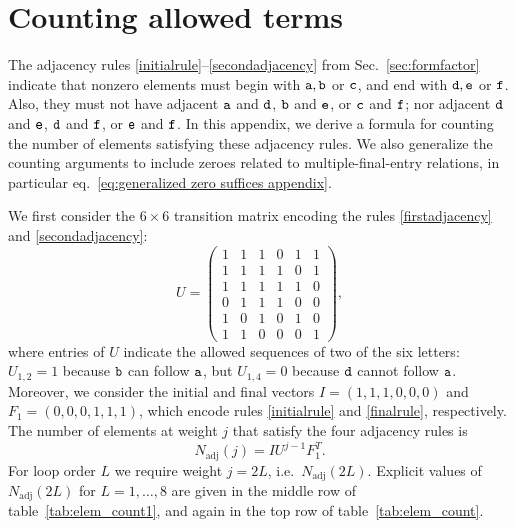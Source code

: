 \documentclass[12pt]{article}
\begin{document}
\section{Counting allowed terms} \label{app:combinatorics}

The adjacency rules \ref{initialrule}--\ref{secondadjacency} from 
Sec.~\ref{sec:formfactor} indicate that nonzero elements must begin with ${\tt a},{\tt b}$ or ${\tt c}$, and end with ${\tt d,e}$ or ${\tt f}$. Also, they must not have adjacent ${\tt a}$ and ${\tt d}$, ${\tt b}$ and ${\tt e}$, or ${\tt c}$ and ${\tt f}$; nor adjacent ${\tt d}$ and ${\tt e}$, ${\tt d}$ and ${\tt f}$, or ${\tt e}$ and ${\tt f}$. In this appendix, we derive a formula for counting the number of elements satisfying these adjacency rules.  We also generalize the counting arguments to include zeroes related to multiple-final-entry relations, in particular eq.~\eqref{eq:generalized zero suffices appendix}.

We first consider the $6 \times 6$ transition matrix encoding the rules \ref{firstadjacency} and \ref{secondadjacency}:
%
\begin{equation}
    U=\begin{pmatrix}1&1&1&0&1&1\\ 1&1&1&1&0&1\\ 1&1&1&1 &1&0\\ 0&1&1&1&0&0\\1&0&1&0&1&0\\ 1&1&0&0&0&1\end{pmatrix},
\end{equation}
%
where entries of $U$ indicate the allowed sequences of two of the six letters: $U_{1,2}=1$ because ${\tt b}$ can follow ${\tt a}$, but $U_{1,4}=0$ because ${\tt d}$ cannot follow ${\tt a}$. Moreover, we consider the initial and final vectors $I=(1,1,1,0,0,0)$ and $F_1=(0,0,0,1,1,1)$, which encode rules \ref{initialrule} and \ref{finalrule}, respectively. 
The number of elements at weight $j$ that satisfy the four adjacency rules is 
%
\begin{equation}
\label{eq: counting zeros}
N_{\text{adj}}(j) = I U^{j-1} F_1^T .
\end{equation}
%
For loop order $L$ we require weight $j=2L$, i.e.~$N_{\text{adj}}(2L)$.  Explicit values of $N_{\text{adj}}(2L)$ for $L=1,\dots,8$ are given in the middle row of table~\ref{tab:elem_count1}, and again in the top row of table~\ref{tab:elem_count}. 
\end{document}
